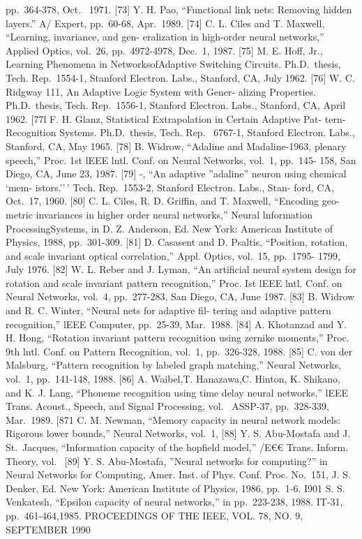 pp.~364-378, Oct.~ 1971. {[}73{]} Y. H. Pao, ``Functional link nets:
Removing hidden layers.'' A/ Expert, pp.~60-68, Apr.~1989. {[}74{]} C.
L. Ciles and T. Maxwell, ``Learning, invariance, and gen- eralization in
high-order neural networks,'' Applied Optics, vol.~26, pp.~4972-4978,
Dec.~1, 1987. {[}75{]} M. E. Hoff, Jr., Learning Phenomena in
NetworksofAdaptive Switching Circuits. Ph.D.~thesis, Tech. Rep.~1554-1,
Stanford Electron. Labs., Stanford, CA, July 1962. {[}76{]} W. C.
Ridgway 111, An Adaptive Logic System with Gener- alizing Properties.
Ph.D.~thesis, Tech. Rep.~1556-1, Stanford Electron. Labs., Stanford, CA,
April 1962. {[}77l F. H. Glanz, Statistical Extrapolation in Certain
Adaptive Pat- tern-Recognition Systems. Ph.D.~thesis, Tech. Rep.~
6767-1, Stanford Electron. Labs., Stanford, CA, May 1965. {[}78{]} B.
Widrow, ``Adaline and Madaline-1963, plenary speech,'' Proc. 1st lEEE
lntl. Conf. on Neural Networks, vol.~1, pp.~145- 158, San Diego, CA,
June 23, 1987. {[}79{]} -, ``An adaptive ''adaline'' neuron using
chemical `mem- istors.''\,' Tech. Rep.~1553-2, Stanford Electron. Labs.,
Stan- ford, CA, Oct.~17, 1960. {[}80{]} C. L. Ciles, R. D. Griffin, and
T. Maxwell, ``Encoding geo- metric invariances in higher order neural
networks,'' Neural lnformation ProcessingSystems, in D. Z. Anderson, Ed.
New York: American Institute of Physics, 1988, pp.~301-309. {[}81{]} D.
Casasent and D. Psaltis, ``Position, rotation, and scale invariant
optical correlation,'' Appl. Optics, vol.~15, pp.~1795- 1799, July 1976.
{[}82{]} W. L. Reber and J. Lyman, ``An artificial neural system design
for rotation and scale invariant pattern recognition,'' Proc. Ist lEEE
lntl. Conf. on Neural Networks, vol.~4, pp.~277-283, San Diego, CA, June
1987. {[}83{]} B. Widrow and R. C. Winter, ``Neural nets for adaptive
fil- tering and adaptive pattern recognition,'' lEEE Computer,
pp.~25-39, Mar.~1988. {[}84{]} A. Khotanzad and Y. H. Hong, ``Rotation
invariant pattern recognition using zernike moments,'' Proc. 9th lntl.
Conf. on Pattern Recognition, vol.~1, pp.~326-328, 1988. {[}85{]} C. von
der Malsburg, ``Pattern recognition by labeled graph matching,'' Neural
Networks, vol.~1, pp.~141-148, 1988. {[}86{]} A. Waibel,T. Hanazawa,C.
Hinton, K. Shikano, and K. J. Lang, ``Phoneme recognition using time
delay neural networks,'' lEEE Trans. Acoust., Speech, and Signal
Processing, vol.~ ASSP-37, pp.~328-339, Mar.~1989. {[}871 C. M. Newman,
``Memory capacity in neural network models: Rigorous lower bounds,''
Neural Networks, vol.~1, {[}88{]} Y. S. Abu-Mostafa and J. St.~Jacques,
``Information capacity of the hopfield model,'' /E€€ Trans. Inform.
Theory, vol.~ {[}89{]} Y. S. Abu-Mostafa, ''Neural networks for
computing?'' in Neural Networks for Computing, Amer. Inst. of Phys.
Conf. Proc. No.~151, J. S. Denker, Ed. New York: American Institute of
Physics, 1986, pp.~1-6. I901 S. S. Venkatesh, ``Epsilon capacity of
neural networks,'' in pp.~223-238, 1988. IT-31, pp.~461-464,1985.
PROCEEDINGS OF THE IEEE, VOL. 78, NO. 9, SEPTEMBER 1990

